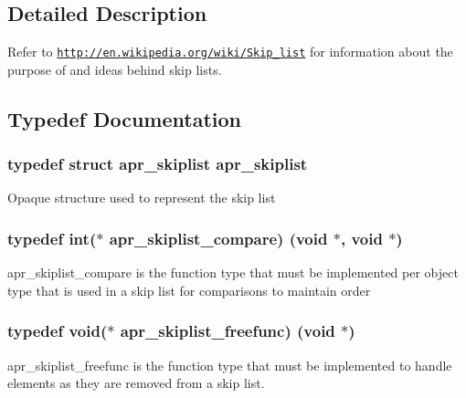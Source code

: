 \subsection{Detailed Description}
Refer to \href{http://en.wikipedia.org/wiki/Skip_list}{\tt http\+://en.\+wikipedia.\+org/wiki/\+Skip\+\_\+list} for information about the purpose of and ideas behind skip lists. 

\subsection{Typedef Documentation}
\subsubsection[{\texorpdfstring{apr\+\_\+skiplist}{apr_skiplist}}]{\setlength{\rightskip}{0pt plus 5cm}typedef struct {\bf apr\+\_\+skiplist} {\bf apr\+\_\+skiplist}}\hypertarget{group__apr__skiplist_gac79ddf14bb5cb5b6d35961309eadec48}{}\label{group__apr__skiplist_gac79ddf14bb5cb5b6d35961309eadec48}
Opaque structure used to represent the skip list 
\subsubsection[{\texorpdfstring{apr\+\_\+skiplist\+\_\+compare}{apr_skiplist_compare}}]{\setlength{\rightskip}{0pt plus 5cm}typedef {\bf int}($\ast$ apr\+\_\+skiplist\+\_\+compare) ({\bf void} $\ast$, {\bf void} $\ast$)}\hypertarget{group__apr__skiplist_ga873aa114e692e48c6587277680ceba87}{}\label{group__apr__skiplist_ga873aa114e692e48c6587277680ceba87}
apr\+\_\+skiplist\+\_\+compare is the function type that must be implemented per object type that is used in a skip list for comparisons to maintain order 
\subsubsection[{\texorpdfstring{apr\+\_\+skiplist\+\_\+freefunc}{apr_skiplist_freefunc}}]{\setlength{\rightskip}{0pt plus 5cm}typedef {\bf void}($\ast$ apr\+\_\+skiplist\+\_\+freefunc) ({\bf void} $\ast$)}\hypertarget{group__apr__skiplist_ga326fdccaf516e5296969fa03bbda3fca}{}\label{group__apr__skiplist_ga326fdccaf516e5296969fa03bbda3fca}
apr\+\_\+skiplist\+\_\+freefunc is the function type that must be implemented to handle elements as they are removed from a skip list. 

